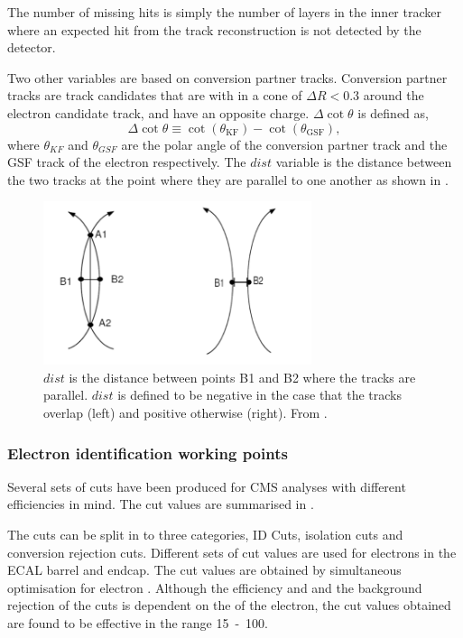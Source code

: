 The number of missing hits is simply the number of layers in the inner
tracker where an expected hit from the track reconstruction is not detected by
the detector.

Two other variables are based on conversion partner tracks.
Conversion partner tracks are track candidates that are with in a cone of $\Delta
R < 0.3$ around the electron candidate track, and have an opposite charge. 
$\Delta\cot\theta$ is defined as,
\begin{equation}
\Delta \cot \theta \equiv \cot(\theta_{\text{KF}}) - \cot(\theta_{\text{GSF}}),
\end{equation}
where $\theta_{KF}$ and $\theta_{GSF}$ are the polar angle of the conversion
partner track and the GSF track of the electron respectively.
The $dist$ variable is the distance between the two tracks at the point where
they are parallel to one another as shown in .

\begin{figure}[htbp]
  \centering
  \includegraphics[width=0.7\textwidth]{dist}
  \caption{$dist$ is the distance between points B1 and B2 where the tracks are
parallel. $dist$ is defined to be negative in the case that the tracks overlap
(left) and positive otherwise (right). From \cite{eConver}.}
  \label{fig:dist}
\end{figure}

\subsubsection{Electron identification working points}

Several sets of cuts have been produced for CMS analyses with different
efficiencies in mind. The cut values are summarised in 
\cite{nikos}.

The cuts can be split in to three categories, ID Cuts, isolation cuts and
conversion rejection cuts. Different sets of cut values are used for electrons in the
ECAL barrel and endcap. The cut values are obtained by simultaneous optimisation
for electron \unit{}{\GeV}. Although the efficiency and and the background
rejection of the cuts is dependent on the \ET of the electron, the cut values
obtained are found to be effective in the range \unit{15-100}{\GeV}.\cite{nikos}

